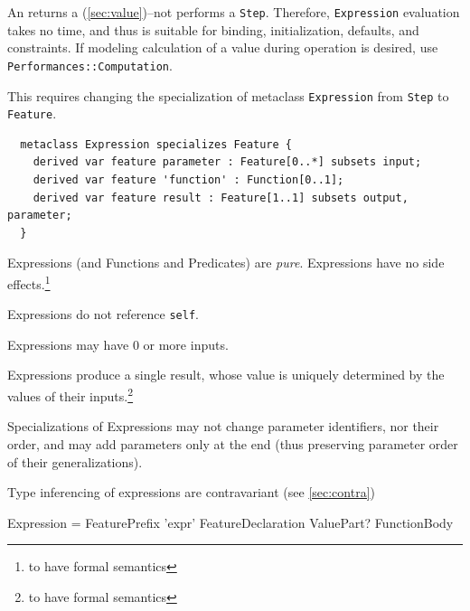 

\label{sec:expressions}

%

\pn An  returns a  (\ref{sec:value})--not performs a \texttt{Step}.  Therefore, \texttt{Expression} evaluation takes no time, and thus is suitable for binding, initialization, defaults, and constraints.   If modeling calculation of a value during operation is desired, use  \texttt{Performances::Computation}.  

\pn This requires changing the specialization of metaclass \texttt{Expression} from \texttt{Step} to \texttt{Feature}.
\begin{lstlisting}
  metaclass Expression specializes Feature {
  	derived var feature parameter : Feature[0..*] subsets input;
  	derived var feature 'function' : Function[0..1];
  	derived var feature result : Feature[1..1] subsets output, parameter;
  }
\end{lstlisting}

 \pn Expressions (and Functions and Predicates) are \emph{pure}.
 Expressions have no side effects.\footnote{to have formal semantics}

\pn Expressions do not reference \texttt{self}.

\pn Expressions may have 0 or more inputs.

\pn Expressions produce a single result, whose value is uniquely determined by the values of their inputs.\footnote{to have formal semantics}

\pn Specializations of Expressions may not change parameter identifiers, nor their order,
and may add parameters only at the end (thus preserving parameter order of their generalizations).

\pn Type inferencing of expressions are contravariant (see \ref{sec:contra})

\begin{bnf}
Expression =
  FeaturePrefix
  'expr' FeatureDeclaration ValuePart?
  FunctionBody 
\end{bnf}


